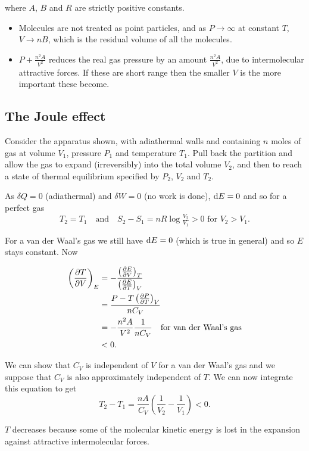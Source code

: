 \documentclass{notes}
\newcommand{\pdf}[3]{\left(\pd{#1}{#2}\right)_{#3}}
\begin{document}
where $A$, $B$ and $R$ are strictly positive constants.

\begin{itemize}
\item Molecules are not treated as point particles, and as $P \to
  \infty$ at constant $T$, $V \to n B$, which is the residual volume
  of all the molecules.
\item $P + \tfrac{n^2 A}{V^2}$ reduces the real gas pressure by
  an amount $\tfrac{n^2 A}{V^2}$, due to intermolecular attractive forces.
  If these are short range then the smaller $V$ is the more important these
  become.
\end{itemize}

\subsection{The Joule effect}


\vspace{1in}

Consider the apparatus shown, with adiathermal walls and containing
$n$ moles of gas at volume $V_1$, pressure $P_1$ and temperature
$T_1$.  Pull back the partition and allow the gas to expand
(irreversibly) into the total volume $V_2$, and then to reach a state
of thermal equilibrium specified by $P_2$, $V_2$ and $T_2$.

As $\delta Q = 0$ (adiathermal) and $\delta W = 0$ (no work is done),
$\mathrm{d} E = 0$ and so for a perfect gas
\[
T_2 = T_1 \quad \text{and} \quad S_2 - S_1 = n R \log \tfrac{V_2}{V_1} > 0
\text{ for $V_2 > V_1$.}
\]

For a van der Waal's gas we still have $\mathrm{d} E = 0$ (which is true in general)
and so $E$ stays constant.  Now

\begin{align*}
\pdf{T}{V}{E} &= - \frac{\pdf{E}{V}{T}}{\pdf{E}{T}{V}} \\
&= \frac{P - T \pdf{P}{T}{V}}{n C_V} \\
&= - \frac{n^2 A}{V^2} \frac{1}{n C_V} \quad \text{for van der Waal's gas} \\
&< 0. 
\end{align*}

We can show that $C_V$ is independent of $V$ for a van der Waal's gas
and we suppose that $C_V$ is also approximately independent of $T$.  We
can now integrate this equation to get
\[
T_2 - T_1 = \frac{n A}{C_V} \left( \frac{1}{V_2} - \frac{1}{V_1}\right) < 0.
\]

$T$ decreases because some of the molecular kinetic energy is lost in
the expansion against attractive intermolecular forces.
\end{document}
